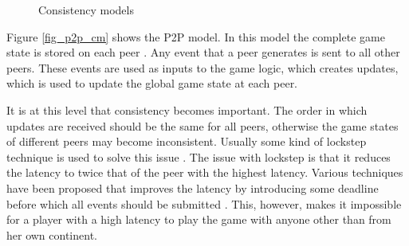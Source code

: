 \documentclass[journal,oneside,a4paper,onecolumn]{IEEEtran}
\begin{document}
\begin{figure}[htbp]
\centering
{}
\caption{Consistency models}
\end{figure}
%
Figure \ref{fig_p2p_cm} shows the P2P model. In this model the complete game state is stored on each peer \cite{}. Any event that a peer generates is sent to all other peers. These events are used as inputs to the game logic, which creates updates, which is used to update the global game state at each peer.

It is at this level that consistency becomes important. The order in which updates are received should be the same for all peers, otherwise the game states of different peers may become inconsistent. Usually some kind of lockstep technique is used to solve this issue \cite{pessimistic_lock_step}. The issue with lockstep is that it reduces the latency to twice that of the peer with the highest latency. Various techniques have been proposed that improves the latency by introducing some deadline before which all events should be submitted \cite{cheat_proof_event_ordering}. This, however, makes it impossible for a player with a high latency to play the game with anyone other than from her own continent.
\end{document}
